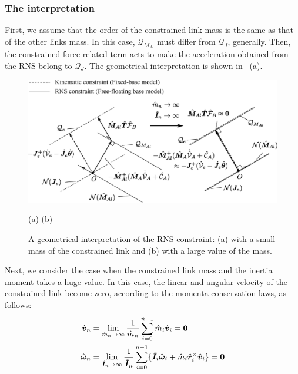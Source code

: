 \subsubsection{The interpretation}
First, we assume that the order of the constrained link mass is the same as that of the other links mass.
In this case, $\mathcal{Q}_{M_{Al}}$ must differ from $\mathcal{Q}_{J}$, generally.
Then, the constrained force related term acts to make the acceleration obtained from the RNS
belong to $\mathcal{Q}_{J}$.
The geometrical interpretation is shown in ~(a).
%
\begin{figure}[t]
  \centering
  \begin{minipage}{1.0\linewidth}
    \centering
    \includegraphics[width=1.0\linewidth]{fig/chapter7/mass/geo.eps}
    \vspace{0mm}
    \footnotesize\par{(a) \hspace{20em} (b)}
  \end{minipage}
  \caption{A geometrical interpretation of the RNS constraint:
  (a) with a small mass of the constrained link and (b) with a large value of the mass.}
  \label{fig:GEO}
\end{figure}
%
Next, we consider the case when the constrained link mass and the inertia moment takes a huge value.
In this case, the linear and angular velocity of the constrained link become zero,
according to the momenta conservation laws, as follows:
%
\begin{align}
  \hat{\bm{v}}_{n} &= \lim_{\hat{m}_{n} \rightarrow \infty}\frac{1}{\hat{m}_{n}}\sum_{i=0}^{n-1}\hat{m}_{i}\hat{\bm{v}}_{i}
  = \bm{0}\\
  \hat{\bm{\omega}}_{n} &= \lim_{\hat{\bm{I}}_{n} \rightarrow \infty}
  \frac{1}{{\hat{\bm{I}}}_{n}}\sum_{i=0}^{n-1}\{\hat{\bm{I}}_{i}\hat{\bm{\omega}}_{i} + \hat{m}_{i}\hat{\bm{r}}_{i}^{\times}\hat{\bm{v}}_{i}\} 
  = \bm{0}
\end{align}
